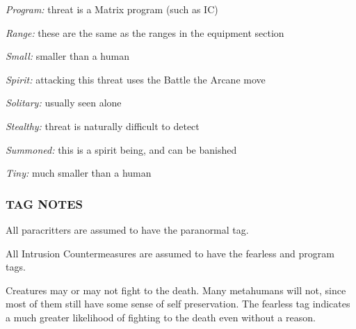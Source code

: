 \documentclass[oneside,10pt]{article}
\begin{document}
\begin{multicols}{2}
\textit{Program:} threat is a Matrix program (such as IC)

\textit{Range:} these are the same as the ranges in the equipment
section

\textit{Small:} smaller than a human

\textit{Spirit:} attacking this threat uses the Battle the Arcane move

\textit{Solitary:} usually seen alone

\textit{Stealthy:} threat is naturally difficult to detect

\textit{Summoned:} this is a spirit being, and can be banished

\textit{Tiny:} much smaller than a human

\subsubsection{TAG NOTES}
All paracritters are assumed to have the paranormal tag.

All Intrusion Countermeasures are assumed to have the
fearless and program tags.

Creatures may or may not fight to the death. Many
metahumans will not, since most of them still have
some sense of self preservation. The fearless tag indicates a much greater likelihood of fighting to the death
even without a reason.

\end{multicols}
\end{document}
